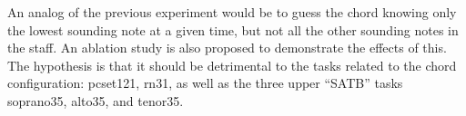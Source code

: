 
An analog of the previous experiment would be to guess the
chord knowing only the lowest sounding note at a given time,
but not all the other sounding notes in the staff. An
ablation study is also proposed to demonstrate the effects
of this. The hypothesis is that it should be detrimental to
the tasks related to the chord configuration:
\gls{pcset121}, \gls{rn31}, as well as the three upper
``SATB'' tasks \gls{soprano35}, \gls{alto35}, and
\gls{tenor35}.
